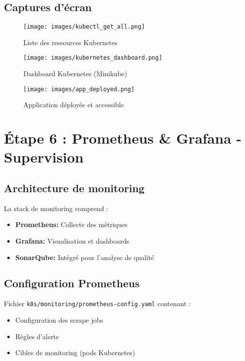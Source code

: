 \documentclass[12pt,a4paper]{article}
\begin{document}
\subsection{Captures d'écran}

\begin{figure}[H]
    \centering
    \texttt{[image: images/kubectl\_get\_all.png]}
    \caption{Liste des ressources Kubernetes}
    \label{fig:kubectl_all}
\end{figure}

\begin{figure}[H]
    \centering
    \texttt{[image: images/kubernetes\_dashboard.png]}
    \caption{Dashboard Kubernetes (Minikube)}
    \label{fig:k8s_dashboard}
\end{figure}

\begin{figure}[H]
    \centering
    \texttt{[image: images/app\_deployed.png]}
    \caption{Application déployée et accessible}
    \label{fig:app_deployed}
\end{figure}

\newpage

\section{Étape 6 : Prometheus \& Grafana - Supervision}

\subsection{Architecture de monitoring}

La stack de monitoring comprend :
\begin{itemize}
    \item \textbf{Prometheus:} Collecte des métriques
    \item \textbf{Grafana:} Visualisation et dashboards
    \item \textbf{SonarQube:} Intégré pour l'analyse de qualité
\end{itemize}

\subsection{Configuration Prometheus}

Fichier \texttt{k8s/monitoring/prometheus-config.yaml} contenant :
\begin{itemize}
    \item Configuration des scrape jobs
    \item Règles d'alerte
    \item Cibles de monitoring (pods Kubernetes)
\end{itemize}
\end{document}
